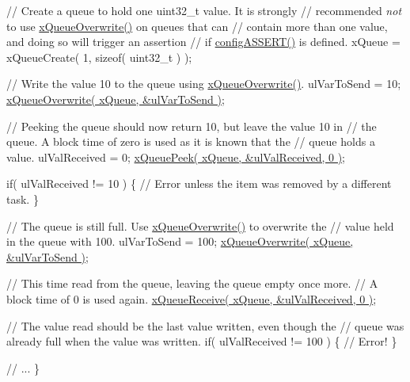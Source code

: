 \begin{DoxyPre}    // Create a queue to hold one uint32\_t value.  It is strongly
    // recommended {\itshape not} to use \hyperlink{queue_8h_a8e9ced123b5a0e37a36d3bbdb2e56b4e}{xQueueOverwrite()} on queues that can
    // contain more than one value, and doing so will trigger an assertion
    // if \hyperlink{_free_r_t_o_s_8h_a228c70cd48927d6ab730ed1a6dfbe35f}{configASSERT()} is defined.
    xQueue = xQueueCreate( 1, sizeof( uint32\_t ) );\end{DoxyPre}



\begin{DoxyPre}    // Write the value 10 to the queue using \hyperlink{queue_8h_a8e9ced123b5a0e37a36d3bbdb2e56b4e}{xQueueOverwrite()}.
    ulVarToSend = 10;
    \hyperlink{queue_8h_a8e9ced123b5a0e37a36d3bbdb2e56b4e}{xQueueOverwrite( xQueue, &ulVarToSend )};\end{DoxyPre}



\begin{DoxyPre}    // Peeking the queue should now return 10, but leave the value 10 in
    // the queue.  A block time of zero is used as it is known that the
    // queue holds a value.
    ulValReceived = 0;
    \hyperlink{queue_8h_a2df70733bb875477cd9614c5b3446257}{xQueuePeek( xQueue, &ulValReceived, 0 )};\end{DoxyPre}



\begin{DoxyPre}    if( ulValReceived != 10 )
    \{
        // Error unless the item was removed by a different task.
    \}\end{DoxyPre}



\begin{DoxyPre}    // The queue is still full.  Use \hyperlink{queue_8h_a8e9ced123b5a0e37a36d3bbdb2e56b4e}{xQueueOverwrite()} to overwrite the
    // value held in the queue with 100.
    ulVarToSend = 100;
    \hyperlink{queue_8h_a8e9ced123b5a0e37a36d3bbdb2e56b4e}{xQueueOverwrite( xQueue, &ulVarToSend )};\end{DoxyPre}



\begin{DoxyPre}    // This time read from the queue, leaving the queue empty once more.
    // A block time of 0 is used again.
    \hyperlink{queue_8h_af1549eac0e7f05694a59a0b967c80be3}{xQueueReceive( xQueue, &ulValReceived, 0 )};\end{DoxyPre}



\begin{DoxyPre}    // The value read should be the last value written, even though the
    // queue was already full when the value was written.
    if( ulValReceived != 100 )
    \{
        // Error!
    \}\end{DoxyPre}



\begin{DoxyPre}    // ...
\}
 \end{DoxyPre}
 